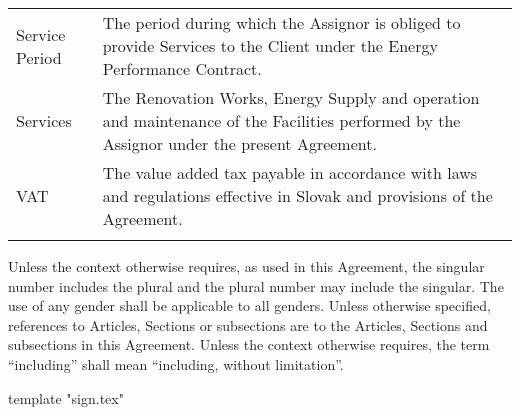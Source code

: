 \documentclass[a4paper]{article}
\begin{document}
\begin{longtabu}{|X|X[2]|}
   \hline

   Service Period & The period during which the Assignor is obliged to
   provide Services to the Client under the Energy Performance
   Contract.\\\tabucline{}

   \hline

   Services & The Renovation Works, Energy Supply and operation and
   maintenance of the Facilities performed by the Assignor under the
   present Agreement.\\\tabucline{}

   \hline

   VAT & The value added tax payable in accordance with laws and
   regulations effective in Slovak and provisions of the Agreement.\\\tabucline{}

 \end{longtabu}

 \vspace{5mm}

 Unless the context otherwise requires, as used in this Agreement, the
 singular number includes the plural and the plural number may include
 the singular. The use of any gender shall be applicable to all
 genders. Unless otherwise specified, references to Articles, Sections
 or subsections are to the Articles, Sections and subsections in this
 Agreement. Unless the context otherwise requires, the term “including”
 shall mean “including, without limitation”. \par

\vspace{5mm}

{{ template "sign.tex"}}
\end{document}

